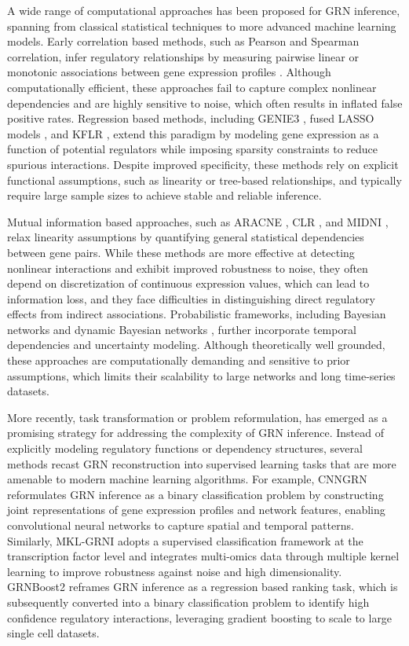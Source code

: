 A wide range of computational approaches has been proposed for GRN inference, spanning from classical statistical techniques to more advanced machine learning models. Early correlation based methods, such as Pearson and Spearman correlation, infer regulatory relationships by measuring pairwise linear or monotonic associations between gene expression profiles \parencite{langfelder2008, guo2014inferring}. Although computationally efficient, these approaches fail to capture complex nonlinear dependencies and are highly sensitive to noise, which often results in inflated false positive rates. Regression based methods, including GENIE3 \parencite{huynhthu2010}, fused LASSO models \parencite{omranian2016gene}, and KFLR \parencite{pirgazi2018robust}, extend this paradigm by modeling gene expression as a function of potential regulators while imposing sparsity constraints to reduce spurious interactions. Despite improved specificity, these methods rely on explicit functional assumptions, such as linearity or tree-based relationships, and typically require large sample sizes to achieve stable and reliable inference.

Mutual information based approaches, such as ARACNE \parencite{margolin2006}, CLR \parencite{faith2007}, and MIDNI \parencite{anh2023mutual}, relax linearity assumptions by quantifying general statistical dependencies between gene pairs. While these methods are more effective at detecting nonlinear interactions and exhibit improved robustness to noise, they often depend on discretization of continuous expression values, which can lead to information loss, and they face difficulties in distinguishing direct regulatory effects from indirect associations. Probabilistic frameworks, including Bayesian networks \parencite{wilczynski2009} and dynamic Bayesian networks \parencite{ajmal2021dynamic, suter2022discovering}, further incorporate temporal dependencies and uncertainty modeling. Although theoretically well grounded, these approaches are computationally demanding and sensitive to prior assumptions, which limits their scalability to large networks and long time-series datasets.

More recently, task transformation or problem reformulation, has emerged as a promising strategy for addressing the complexity of GRN inference. Instead of explicitly modeling regulatory functions or dependency structures, several methods recast GRN reconstruction into supervised learning tasks that are more amenable to modern machine learning algorithms. For example, CNNGRN \parencite{Gao2023} reformulates GRN inference as a binary classification problem by constructing joint representations of gene expression profiles and network features, enabling convolutional neural networks to capture spatial and temporal patterns. Similarly, MKL-GRNI \parencite{Wani2021} adopts a supervised classification framework at the transcription factor level and integrates multi-omics data through multiple kernel learning to improve robustness against noise and high dimensionality. GRNBoost2 \parencite{Moerman2019} reframes GRN inference as a regression based ranking task, which is subsequently converted into a binary classification problem to identify high confidence regulatory interactions, leveraging gradient boosting to scale to large single cell datasets.

